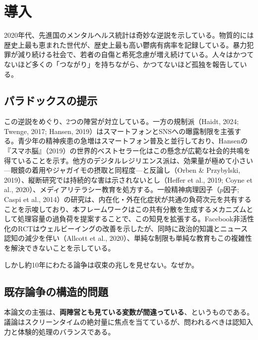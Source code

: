 \documentclass[a4paper,11pt,titlepage]{article}
\begin{document}
\newpage
\tableofcontents
\newpage

\section{導入}\label{sec:introduction}

2020年代、先進国のメンタルヘルス統計は奇妙な逆説を示している。物質的には歴史上最も恵まれた世代が、歴史上最も高い鬱病有病率を記録している。暴力犯罪が減り続ける社会で、若者の自傷と希死念慮が増え続けている。人々はかつてないほど多くの「つながり」を持ちながら、かつてないほど孤独を報告している。

\subsection{パラドックスの提示}

この逆説をめぐり、2つの陣営が対立している。一方の規制派（Haidt, 2024; Twenge, 2017; Hansen, 2019）はスマートフォンとSNSへの曝露制限を主張する。青少年の精神疾患の急増はスマートフォン普及と並行しており、Hansenの『スマホ脳』（2019）の世界的ベストセラー化はこの懸念が広範な社会的共鳴を得ていることを示す。他方のデジタルレジリエンス派は、効果量が極めて小さい---眼鏡の着用やジャガイモの摂取と同程度---と反論し（Orben \& Przybylski, 2019）、縦断研究では持続的な害は示されないとし（Heffer et al., 2019; Coyne et al., 2020）、メディアリテラシー教育を処方する。一般精神病理因子（$p$因子; Caspi et al., 2014）の研究は、内在化・外在化症状が共通の負荷次元を共有することを示唆しており、本フレームワークはこの共有分散を生成するメカニズムとして処理容量の過負荷を提案することで、この知見を拡張する。Facebook非活性化のRCTはウェルビーイングの改善を示したが、同時に政治的知識とニュース認知の減少を伴い（Allcott et al., 2020）、単純な制限も単純な教育もこの複雑性を解決できないことを示している。

しかし約10年にわたる論争は収束の兆しを見せない。なぜか。

\subsection{既存論争の構造的問題}

本論文の主張は、\textbf{両陣営とも見ている変数が間違っている}、というものである。議論はスクリーンタイムの絶対量に焦点を当てているが、問われるべきは認知入力と体験的処理のバランスである。
\end{document}
